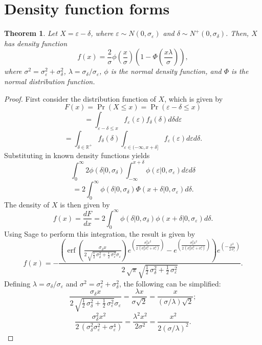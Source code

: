 \documentclass{article}
\newtheorem{theorem}{Theorem}
\newcommand{\ep}{\varepsilon}
\newcommand{\RR}{\mathbb{R}}
\begin{document}
\section{Density function forms}

\begin{theorem}
	Let $X = \ep - \delta$, where $\ep\sim N(0, \sigma_\ep)$ and $\delta\sim N^+(0, \sigma_\delta)$. Then, $X$ has density function
	$$f(x) = \frac{2}{\sigma}\phi\left(\frac{x}{\sigma}\right)\left(1 - \Phi\left(\frac{x\lambda}{\sigma}\right)\right),$$
	where $\sigma^2 = \sigma_\ep^2 + \sigma_\delta^2$, $\lambda = \sigma_\delta / \sigma_\ep$, $\phi$ is the normal density function, and $\Phi$ is the normal distribution function.
\end{theorem}
\begin{proof}
	First consider the distribution function of $X$, which is given by
	$$F(x) = \Pr(X \leq x) = \Pr(\ep - \delta \leq x)$$
	$$= \int_{\ep - \delta \leq x} f_\ep(\ep) f_\delta(\delta) d\delta d\ep$$
	$$= \int_{\delta\in\RR^+} f_\delta(\delta) \int_{\ep\in (-\infty, x + \delta]} f_\ep(\ep) d\ep d\delta.$$
	Substituting in known density functions yields
	$$\int_0^\infty 2\phi(\delta | 0, \sigma_\delta) \int_{-\infty}^{x + \delta} \phi(\ep | 0, \sigma_\ep) d\ep d\delta$$
	$$= 2\int_0^\infty \phi(\delta | 0, \sigma_\delta) \Phi(x + \delta | 0, \sigma_\ep) d\delta.$$
	The density of $X$ is then given by
	$$f(x) = \frac{dF}{dx} = 2\int_0^\infty \phi(\delta | 0, \sigma_\delta) \phi(x + \delta | 0, \sigma_\ep) d\delta.$$
	Using Sage to perform this integration, the result is given by
	$$f(x) = -\frac{{\left(\operatorname{erf}\left(\frac{\sigma_{\delta} x}{2 \, \sqrt{\frac{1}{2} \, \sigma_{\delta}^{2} + \frac{1}{2} \, \sigma_{\ep}^{2}} \sigma_{\ep}}\right) e^{\left(\frac{\sigma_{\delta}^{2} x^{2}}{2 \, {\left(\sigma_{\delta}^{2} \sigma_{\ep}^{2} + \sigma_{\ep}^{4}\right)}}\right)} - e^{\left(\frac{\sigma_{\delta}^{2} x^{2}}{2 \, {\left(\sigma_{\delta}^{2} \sigma_{\ep}^{2} + \sigma_{\ep}^{4}\right)}}\right)}\right)} e^{\left(-\frac{x^{2}}{2 \, \sigma_{\ep}^{2}}\right)}}{2 \, \sqrt{\pi} \sqrt{\frac{1}{2} \, \sigma_{\delta}^{2} + \frac{1}{2} \, \sigma_{\ep}^{2}}}.$$
	Defining $\lambda = \sigma_\delta / \sigma_\ep$ and $\sigma^2 = \sigma_\ep^2 + \sigma_\delta^2$, the following can be simplified:
	$$\frac{\sigma_{\delta} x}{2 \, \sqrt{\frac{1}{2} \, \sigma_{\delta}^{2} + \frac{1}{2} \, \sigma_{\ep}^{2}} \sigma_{\ep}} = \frac{\lambda x}{\sigma\sqrt{2}} = \frac{x}{(\sigma / \lambda) \sqrt{2}};$$
	$$\frac{\sigma_{\delta}^{2} x^{2}}{2 \, {\left(\sigma_{\delta}^{2} \sigma_{\ep}^{2} + \sigma_{\ep}^{4}\right)}} = \frac{\lambda^2 x^2}{2\sigma^2} = \frac{x^2}{2(\sigma / \lambda)^2}.$$

\end{proof}
\end{document}
